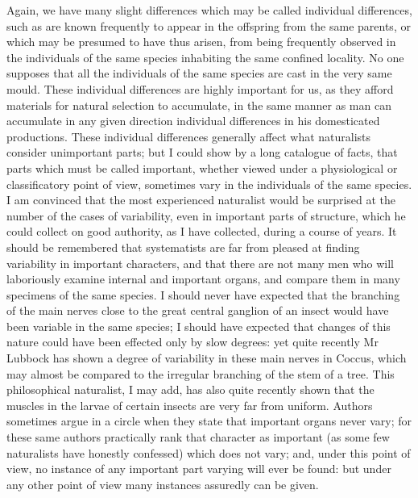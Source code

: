 \indent Again, we have many slight differences which may be called individual differences, such as are known frequently to appear in the offspring from the same parents, or which may be presumed to have thus arisen, from being frequently observed in the individuals of the same species inhabiting the same confined locality.  No one supposes that all the individuals of the same species are cast in the very same mould. These individual differences are highly important for us, as they afford materials for natural selection to accumulate, in the same manner as man can accumulate in any given direction individual differences in his domesticated productions.  These individual differences generally affect what naturalists consider unimportant parts; but I could show by a long catalogue of facts, that parts which must be called important, whether viewed under a physiological or classificatory point of view, sometimes vary in the individuals of the same species. I am convinced that the most experienced naturalist would be surprised at the number of the cases of variability, even in important parts of structure, which he could collect on good authority, as I have collected, during a course of years. It should be remembered that systematists are far from pleased at finding variability in important characters, and that there are not many men who will laboriously examine internal and important organs, and compare them in many specimens of the same species. I should never have expected that the branching of the main nerves close to the great central ganglion of an insect would have been variable in the same species; I should have expected that changes of this nature could have been effected only by slow degrees: yet quite recently Mr Lubbock has shown a degree of variability in these main nerves in Coccus, which may almost be compared to the irregular branching of the stem of a tree. This philosophical naturalist, I may add, has also quite recently shown that the muscles in the larvae of certain insects are very far from uniform. Authors sometimes argue in a circle when they state that important organs never vary; for these same authors practically rank that character as important (as some few naturalists have honestly confessed) which does not vary; and, under this point of view, no instance of any important part varying will ever be found: but under any other point of view many instances assuredly can be given. \\

